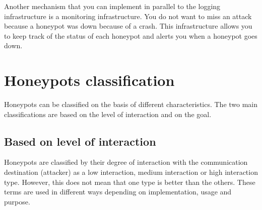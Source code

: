 \documentclass[epsfig,a4paper,11pt,titlepage,oneside,openany]{book}
\begin{document}
Another mechanism that you can implement in parallel to the logging infrastructure is a monitoring infrastructure. You do not want to miss an attack because a honeypot was down because of a crash. This infrastructure allows you to keep track of the status of each honeypot and alerts you when a honeypot goes down.

\chapter{Honeypots classification}

Honeypots can be classified on the basis of different characteristics. The two main classifications are based on the level of interaction and on the goal.

\section{Based on level of interaction}

Honeypots are classified by their degree of interaction with the communication destination (attacker) as a low interaction, medium interaction or  high interaction type. However, this does not mean that one type is better than the others. These terms are used in different ways depending on implementation, usage and purpose.
\end{document}

